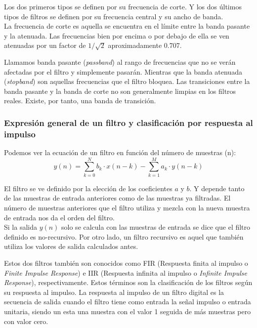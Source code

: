 Los dos primeros tipos se definen por su frecuencia de corte. Y los dos últimos tipos de filtros se definen por su frecuencia central y su ancho de banda.\\

La frecuencia de corte es aquella se encuentra en el límite entre la banda pasante y la atenuada. Las frecuencias bien por encima o por debajo de ella se ven atenuadas por un factor de $1/ \sqrt{2}$ aproximadamente 0.707. 

Llamamos banda pasante (\emph{passband}) al rango de frecuencias que no se verán afectadas por el filtro y simplemente pasarán. Mientras que la banda atenuada (\emph{stopband}) son aquellas frecuencias que el filtro bloquea. Las transiciones entre la banda pasante y la banda de corte no son generalmente limpias en los filtros reales. Existe, por tanto, una banda de transición.

\subsubsection{Expresión general de un filtro y clasificación por respuesta al impulso}

Podemos ver la ecuación de un filtro  en función del número de muestras (n):
$$y(n)= {\sum_{k=0}^N} b_k \cdot x(n-k) - {\sum_{k=1}^M} a_k \cdot y(n-k)$$ \label{eq:filterEq} 

El filtro se ve definido por la elección de los coeficientes $a$ y $b$. Y depende tanto de las muestras de entrada anteriores como de las muestras ya filtradas. El número de muestras anteriores que el filtro utiliza y mezcla con la nueva muestra de entrada nos da el orden del filtro. \\

Si la salida $y(n)$  solo se calcula con las muestras de entrada se dice que el filtro definido es no-recursivo. Por otro lado, un filtro recursivo es aquel que también utiliza los valores de salida calculados antes.

Estos dos filtros también son conocidos como FIR (Respuesta finita al impulso o \emph{Finite Impulse Response}) e IIR (Respuesta infinita al impulso o \emph{Infinite Impulse Response}), respectivamente.
Estos términos son la clasificación de los filtros según su respuesta al impulso. La respuesta al impulso de un filtro digital es la secuencia de salida cuando el filtro tiene como entrada la señal impulso o entrada unitaria, siendo un esta una muestra con el valor 1 seguida de más muestras pero con valor cero. \cite{ref1} %

